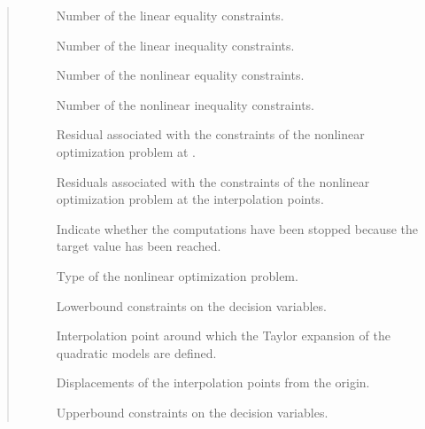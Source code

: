\documentclass[letterpaper,10pt,english]{sphinxmanual}
\begin{document}
\begin{fulllineitems}
\begin{quote}
\begin{description}
\begin{description}
\item[{}] \leavevmode
\sphinxAtStartPar
Number of the linear equality constraints.

\item[{}] \leavevmode
\sphinxAtStartPar
Number of the linear inequality constraints.

\item[{}] \leavevmode
\sphinxAtStartPar
Number of the nonlinear equality constraints.

\item[{}] \leavevmode
\sphinxAtStartPar
Number of the nonlinear inequality constraints.

\item[{}] \leavevmode
\sphinxAtStartPar
Residual associated with the constraints of the nonlinear optimization problem at .

\item[{}] \leavevmode
\sphinxAtStartPar
Residuals associated with the constraints of the nonlinear optimization problem at the interpolation points.

\item[{}] \leavevmode
\sphinxAtStartPar
Indicate whether the computations have been stopped because the target value has been reached.

\item[{}] \leavevmode
\sphinxAtStartPar
Type of the nonlinear optimization problem.

\item[{}] \leavevmode
\sphinxAtStartPar
Lower\sphinxhyphen{}bound constraints on the decision variables.

\item[{}] \leavevmode
\sphinxAtStartPar
Interpolation point around which the Taylor expansion of the quadratic models are defined.

\item[{}] \leavevmode
\sphinxAtStartPar
Displacements of the interpolation points from the origin.

\item[{}] \leavevmode
\sphinxAtStartPar
Upper\sphinxhyphen{}bound constraints on the decision variables.


\end{description}
\end{description}
\end{quote}
\end{fulllineitems}
\end{document}
